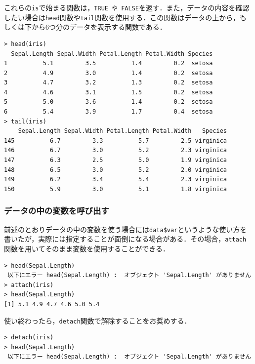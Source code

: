 \documentclass[a4paper,10pt,fleqn]{jarticle}
\begin{document}
これらの{\tt is}で始まる関数は，{\tt TRUE や FALSE}を返す．また，データの内容を確認したい場合は{\tt head}関数や{\tt tail}関数を使用する．この関数はデータの上から，もしくは下から6つ分のデータを表示する関数である．
\begin{breakbox}
\begin{verbatim}
> head(iris)
  Sepal.Length Sepal.Width Petal.Length Petal.Width Species
1          5.1         3.5          1.4         0.2  setosa
2          4.9         3.0          1.4         0.2  setosa
3          4.7         3.2          1.3         0.2  setosa
4          4.6         3.1          1.5         0.2  setosa
5          5.0         3.6          1.4         0.2  setosa
6          5.4         3.9          1.7         0.4  setosa
> tail(iris)
    Sepal.Length Sepal.Width Petal.Length Petal.Width   Species
145          6.7         3.3          5.7         2.5 virginica
146          6.7         3.0          5.2         2.3 virginica
147          6.3         2.5          5.0         1.9 virginica
148          6.5         3.0          5.2         2.0 virginica
149          6.2         3.4          5.4         2.3 virginica
150          5.9         3.0          5.1         1.8 virginica
\end{verbatim}
\end{breakbox}
\subsubsection{データの中の変数を呼び出す}
前述のとおりデータの中の変数を使う場合には\verb+data$var+というような使い方を書いたが，実際には指定することが面倒になる場合がある．その場合，{\tt attach}関数を用いてそのまま変数を使用することができる．
\begin{breakbox}
\begin{verbatim}
> head(Sepal.Length)
 以下にエラー head(Sepal.Length) :  オブジェクト 'Sepal.Length' がありません 
> attach(iris)
> head(Sepal.Length)
[1] 5.1 4.9 4.7 4.6 5.0 5.4
\end{verbatim}
\end{breakbox}
使い終わったら，{\tt detach}関数で解除することをお奨めする．
\begin{breakbox}
\begin{verbatim}
> detach(iris)
> head(Sepal.Length)
 以下にエラー head(Sepal.Length) :  オブジェクト 'Sepal.Length' がありません 
\end{verbatim}
\end{breakbox}
\end{document}
